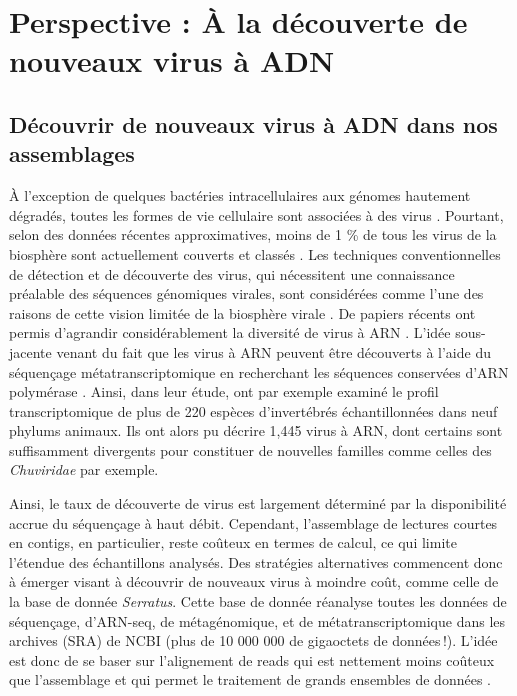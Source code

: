 \thispagestyle{empty}
\chapter{Perspective : À la découverte de nouveaux virus à ADN}
{\hypersetup{linkcolor=GREYDARK}\minitoc}
\label{chap:discuss-new_viral_discovery}

\label{sec:perspective}

\section{Découvrir de nouveaux virus à ADN dans nos assemblages}

À l'exception de quelques bactéries intracellulaires aux génomes hautement dégradés, toutes les formes de vie cellulaire sont associées à des virus \citep{kristensen_new_2010, koonin_virocentric_2013}. Pourtant, selon des données récentes approximatives, moins de 1 \% de tous les virus de la biosphère sont actuellement couverts et classés \citep{geoghegan_comparative_2017}. Les techniques conventionnelles de détection et de découverte des virus, qui nécessitent une connaissance préalable des séquences génomiques virales, sont considérées comme l'une des raisons de cette vision limitée de la biosphère virale \citep{nouri_insect-specific_2018}. De papiers récents ont permis d'agrandir considérablement la diversité de virus à ARN \citep{shi_redefining_2016, wu_abundant_2020}. L'idée sous-jacente venant du fait que les virus à ARN peuvent être découverts à l'aide du séquençage métatranscriptomique en recherchant les séquences conservées d'ARN polymérase \citep{bonning_insect_2019, shi_genomes_2019, wu_abundant_2020}. Ainsi, dans leur étude, \cite{shi_redefining_2016} ont par exemple examiné le profil transcriptomique de plus de 220 espèces d'invertébrés échantillonnées dans neuf phylums animaux. Ils ont alors pu  décrire 1,445 virus à ARN, dont certains sont suffisamment divergents pour constituer de nouvelles familles comme celles des \textit{Chuviridae} par exemple. 

Ainsi, le taux de découverte de virus est largement déterminé par la disponibilité accrue du séquençage à haut débit. Cependant, l'assemblage de lectures courtes en contigs, en particulier, reste coûteux en termes de calcul, ce qui limite l'étendue des échantillons analysés. Des stratégies alternatives commencent donc à émerger visant à découvrir de nouveaux virus à moindre coût, comme celle de la base de donnée \textit{Serratus}. Cette base de donnée réanalyse toutes les données de séquençage, d'ARN-seq, de métagénomique, et de métatranscriptomique  dans les archives (SRA) de NCBI (plus de 10 000 000 de gigaoctets de données !). L'idée est donc de se baser sur l'alignement de reads qui est nettement moins coûteux que l'assemblage et qui permet le traitement de grands ensembles de données \citep{edgar_petabase-scale_2022}.

